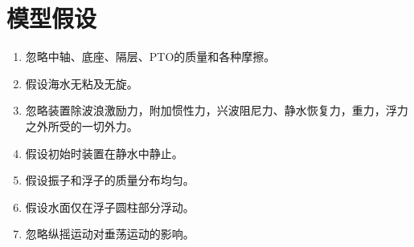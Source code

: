 \documentclass[withoutpreface,bwprint]{cumcmthesis} %
\begin{document}
    \section{模型假设}
    \begin{enumerate}
        \item 忽略中轴、底座、隔层、PTO的质量和各种摩擦。
        \item 假设海水无粘及无旋。
        \item 忽略装置除波浪激励力，附加惯性力，兴波阻尼力、静水恢复力，重力，浮力之外所受的一切外力。
        \item 假设初始时装置在静水中静止。
        \item 假设振子和浮子的质量分布均匀。
        \item 假设水面仅在浮子圆柱部分浮动。 
        \item 忽略纵摇运动对垂荡运动的影响。 
    \end{enumerate}
\end{document}
